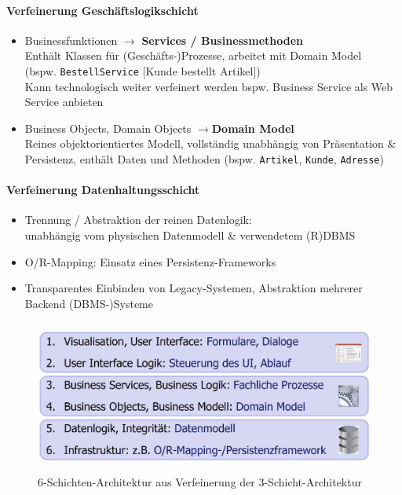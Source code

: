 \documentclass[a4paper]{article}
\begin{document}
				\paragraph{Verfeinerung Geschäftslogikschicht}
				
					\begin{itemize}
						\item Businessfunktionen $\rightarrow$ \textbf{Services / Businessmethoden}\\
						Enthält Klassen für (Geschäfts-)Prozesse, arbeitet mit Domain Model\\
						(bspw. \texttt{BestellService} [Kunde bestellt Artikel])\\
						Kann technologisch weiter verfeinert werden bspw. Business Service als Web Service anbieten
						
						\item Business Objects, Domain Objects $\rightarrow$\textbf{Domain Model}\\
						Reines objektorientiertes Modell, vollständig unabhängig von Präsentation \& Persistenz, enthält Daten und Methoden (bspw. \texttt{Artikel}, \texttt{Kunde}, \texttt{Adresse})
					\end{itemize}
				
				\paragraph{Verfeinerung Datenhaltungsschicht}
				
					\begin{itemize}
						\item Trennung / Abstraktion der reinen Datenlogik:\\
						unabhängig vom physischen Datenmodell \& verwendetem (R)DBMS
						\item O/R-Mapping: Einsatz eines Persistenz-Frameworks
						\item Transparentes Einbinden von Legacy-Systemen, Abstraktion mehrerer Backend (DBMS-)Systeme
					\end{itemize}

				\begin{figure}[!htb]
					\centering
					\includegraphics[keepaspectratio, height=5cm]{img/architecture/6layers.png}
					\caption{6-Schichten-Architektur aus Verfeinerung der 3-Schicht-Architektur}
					\label{fig:6layers}
				\end{figure}		
			
\end{document}
